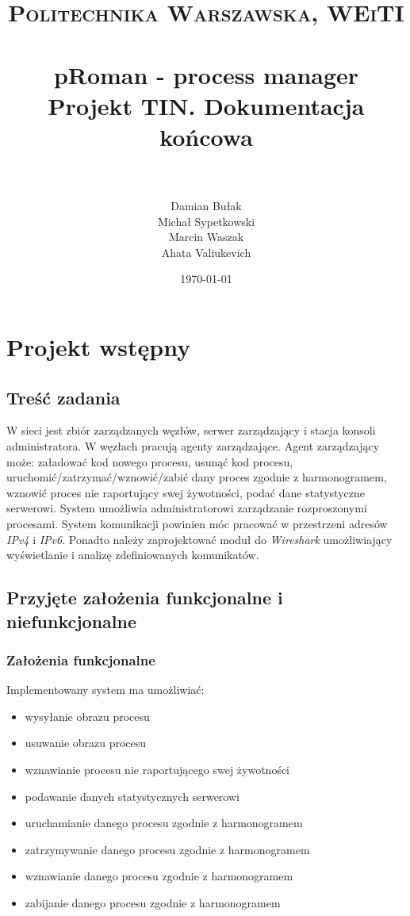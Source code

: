\documentclass[paper=a4, fontsize=11pt]{scrartcl} %
\title{	
\normalfont \normalsize 
\textsc{Politechnika Warszawska, WEiTI} \\ [25pt] %
\horrule{0.5pt} \\[0.4cm] %
\huge pRoman - process manager \\
\large Projekt TIN. Dokumentacja końcowa
 \\ %
\horrule{2pt} \\[0.5cm] %
}
\author{Damian Bułak\\ Michał Sypetkowski\\ Marcin Waszak\\ Ahata Valiukevich} %
\date{\normalsize\today} %
\begin{document}
\maketitle %

\section{Projekt wstępny}
\subsection{Treść zadania}

W sieci jest zbiór zarządzanych węzłów, serwer zarządzający i stacja konsoli administratora. W węzłach pracują agenty zarządzające. Agent zarządzający może: załadować kod nowego procesu, usunąć kod procesu, uruchomić/zatrzymać/wznowić/zabić dany proces zgodnie z harmonogramem, wznowić proces nie raportujący swej żywotności, podać dane statystyczne serwerowi. System umożliwia administratorowi zarządzanie rozproszonymi procesami. System komunikacji powinien móc pracować w przestrzeni adresów \textit{IPv4} i \textit{IPv6}. Ponadto należy zaprojektować moduł do \textit{Wireshark} umożliwiający wyświetlanie i analizę zdefiniowanych komunikatów. 


\subsection{Przyjęte założenia funkcjonalne i niefunkcjonalne}

\subsubsection*{Założenia funkcjonalne}
Implementowany system ma umożliwiać: 
\begin{itemize}
\item wysyłanie obrazu procesu
\item usuwanie obrazu procesu
\item wznawianie  procesu nie raportującego swej żywotności 
\item podawanie danych statystycznych serwerowi
\item uruchamianie danego procesu zgodnie z harmonogramem
\item zatrzymywanie danego procesu zgodnie z harmonogramem
\item wznawianie danego procesu zgodnie z harmonogramem
\item zabijanie danego procesu zgodnie z harmonogramem
\end{itemize}
\end{document}
